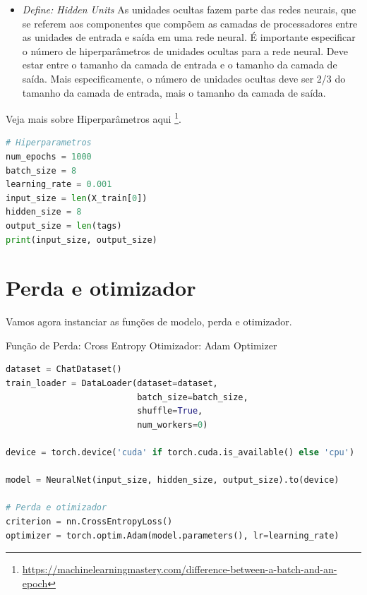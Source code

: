 \begin{itemize}
   \item \textit{Define: Hidden Units} As unidades ocultas fazem parte das redes neurais, que se referem aos componentes que compõem as camadas de processadores entre as unidades de entrada e saída em uma rede neural. É importante especificar o número de hiperparâmetros de unidades ocultas para a rede neural. Deve estar entre o tamanho da camada de entrada e o tamanho da camada de saída. Mais especificamente, o número de unidades ocultas deve ser 2/3 do tamanho da camada de entrada, mais o tamanho da camada de saída.

\end{itemize}


Veja mais sobre Hiperparâmetros aqui \footnote{\url{https://machinelearningmastery.com/difference-between-a-batch-and-an-epoch}}.




\begin{lstlisting}[language=Python, caption=Hiperparâmetros]
# Hiperparametros
num_epochs = 1000
batch_size = 8
learning_rate = 0.001
input_size = len(X_train[0])
hidden_size = 8
output_size = len(tags)
print(input_size, output_size)

\end{lstlisting}

\section[Perda e otimizador]{Perda e otimizador}

Vamos agora instanciar as funções de modelo, perda e otimizador.

Função de Perda: Cross Entropy
Otimizador: Adam Optimizer

\begin{lstlisting}[language=Python, caption=Perda e otimizador]
dataset = ChatDataset()
train_loader = DataLoader(dataset=dataset,
                          batch_size=batch_size,
                          shuffle=True,
                          num_workers=0)

device = torch.device('cuda' if torch.cuda.is_available() else 'cpu')

model = NeuralNet(input_size, hidden_size, output_size).to(device)

# Perda e otimizador
criterion = nn.CrossEntropyLoss()
optimizer = torch.optim.Adam(model.parameters(), lr=learning_rate)

\end{lstlisting}

